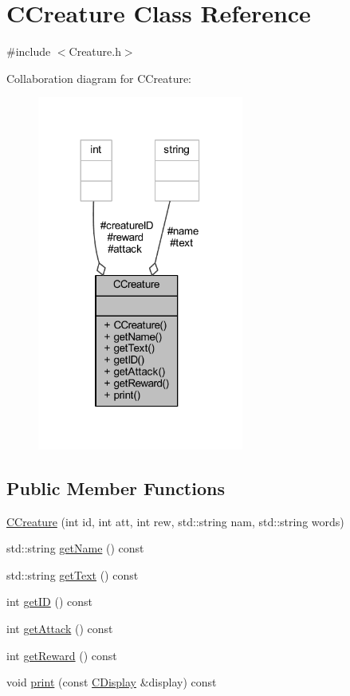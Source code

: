 \hypertarget{class_c_creature}{}\section{C\+Creature Class Reference}
\label{class_c_creature}


{\ttfamily \#include $<$Creature.\+h$>$}



Collaboration diagram for C\+Creature\+:\nopagebreak
\begin{figure}[H]
\begin{center}
\leavevmode
\includegraphics[width=192pt]{class_c_creature__coll__graph}
\end{center}
\end{figure}
\subsection*{Public Member Functions}
\begin{DoxyCompactItemize}
\item 
\mbox{\hyperlink{class_c_creature_a4ea5c6009c88ef683e3c4dd64cc1f888}{C\+Creature}} (int id, int att, int rew, std\+::string nam, std\+::string words)
\item 
std\+::string \mbox{\hyperlink{class_c_creature_add6ec843df265dc929acc0c3ef7ba8d0}{get\+Name}} () const
\item 
std\+::string \mbox{\hyperlink{class_c_creature_a876396dce2bd6e42c09bb9edc72ed0ba}{get\+Text}} () const
\item 
int \mbox{\hyperlink{class_c_creature_af6793eced5b6c7a88b939b3acac7c366}{get\+ID}} () const
\item 
int \mbox{\hyperlink{class_c_creature_ab586f3c2dd37addfa8281fd4d24c7b54}{get\+Attack}} () const
\item 
int \mbox{\hyperlink{class_c_creature_a96cdca38cdd52403c6a6dab222a58f38}{get\+Reward}} () const
\item 
void \mbox{\hyperlink{class_c_creature_a3ea9f0e5ace386bd5ff46555374d192d}{print}} (const \mbox{\hyperlink{class_c_display}{C\+Display}} \&display) const
\end{DoxyCompactItemize}
